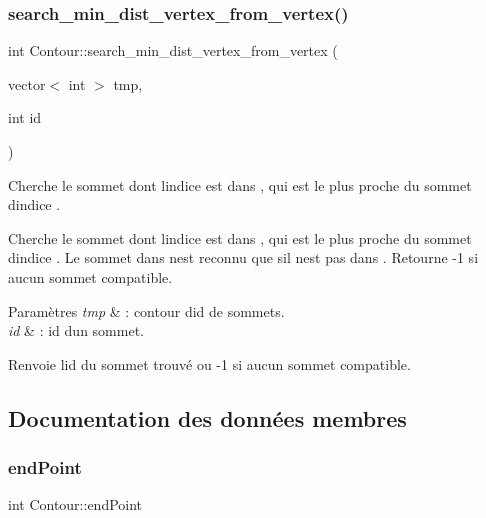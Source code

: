 \subsubsection{\texorpdfstring{search\+\_\+min\+\_\+dist\+\_\+vertex\+\_\+from\+\_\+vertex()}{search\_min\_dist\_vertex\_from\_vertex()}}
{\footnotesize\ttfamily int Contour\+::search\+\_\+min\+\_\+dist\+\_\+vertex\+\_\+from\+\_\+vertex (\begin{DoxyParamCaption}\item[{vector$<$ int $>$}]{tmp,  }\item[{int}]{id }\end{DoxyParamCaption})\hspace{0.3cm}{\ttfamily [protected]}}



Cherche le sommet dont l\textquotesingle{}indice est dans , qui est le plus proche du sommet d\textquotesingle{}indice . 

Cherche le sommet dont l\textquotesingle{}indice est dans , qui est le plus proche du sommet d\textquotesingle{}indice . Le sommet dans  n\textquotesingle{}est reconnu que s\textquotesingle{}il n\textquotesingle{}est pas dans . Retourne -\/1 si aucun sommet compatible.


\begin{DoxyParams}{Paramètres}
{\em tmp} & \+: contour d\textquotesingle{}id de sommets. \\
\hline
{\em id} & \+: id d\textquotesingle{}un sommet.\\
\hline
\end{DoxyParams}
\begin{DoxyReturn}{Renvoie}
l\textquotesingle{}id du sommet trouvé ou -\/1 si aucun sommet compatible. 
\end{DoxyReturn}


\subsection{Documentation des données membres}
\mbox{\label{classContour_a56a02a0bc526980bbfdcec9805ae8a86}} 
\subsubsection{\texorpdfstring{end\+Point}{endPoint}}
{\footnotesize\ttfamily int Contour\+::end\+Point\hspace{0.3cm}{\ttfamily [protected]}}

